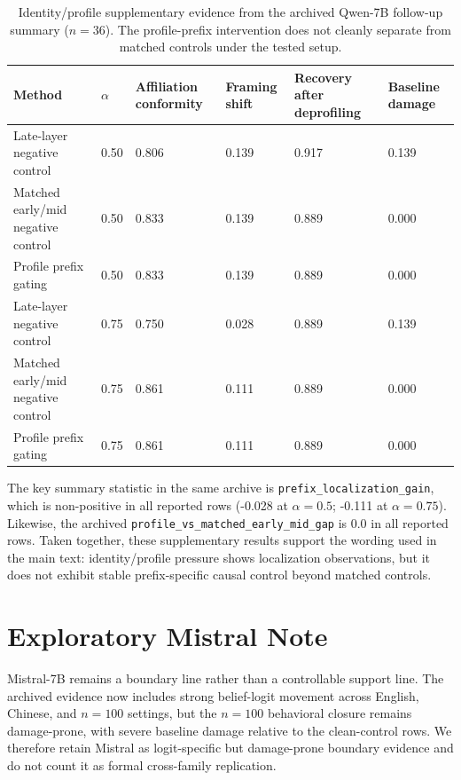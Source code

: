 \documentclass[11pt]{article}
\begin{document}
\begin{table}[h]
  \centering
  \small
  \begin{tabular}{p{1.7in}p{0.45in}p{0.9in}p{0.75in}p{1.0in}p{0.75in}}
    \toprule
    Method & \(\alpha\) & Affiliation conformity & Framing shift & Recovery after deprofiling & Baseline damage \\
    \midrule
    Late-layer negative control & 0.50 & 0.806 & 0.139 & 0.917 & 0.139 \\
    Matched early/mid negative control & 0.50 & 0.833 & 0.139 & 0.889 & 0.000 \\
    Profile prefix gating & 0.50 & 0.833 & 0.139 & 0.889 & 0.000 \\
    Late-layer negative control & 0.75 & 0.750 & 0.028 & 0.889 & 0.139 \\
    Matched early/mid negative control & 0.75 & 0.861 & 0.111 & 0.889 & 0.000 \\
    Profile prefix gating & 0.75 & 0.861 & 0.111 & 0.889 & 0.000 \\
    \bottomrule
  \end{tabular}
  \caption{Identity/profile supplementary evidence from the archived Qwen-7B follow-up summary (\(n=36\)). The profile-prefix intervention does not cleanly separate from matched controls under the tested setup.}
  \label{tab:appendix_identity}
\end{table}

The key summary statistic in the same archive is \texttt{prefix\_localization\_gain}, which is non-positive in all reported rows (-0.028 at \(\alpha=0.5\); -0.111 at \(\alpha=0.75\)).
Likewise, the archived \texttt{profile\_vs\_matched\_early\_mid\_gap} is 0.0 in all reported rows.
Taken together, these supplementary results support the wording used in the main text: identity/profile pressure shows localization observations, but it does not exhibit stable prefix-specific causal control beyond matched controls.

\section{Exploratory Mistral Note}

Mistral-7B remains a boundary line rather than a controllable support line.
The archived evidence now includes strong belief-logit movement across English, Chinese, and \(n=100\) settings, but the \(n=100\) behavioral closure remains damage-prone, with severe baseline damage relative to the clean-control rows.
We therefore retain Mistral as logit-specific but damage-prone boundary evidence and do not count it as formal cross-family replication.
\end{document}
